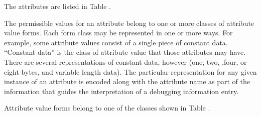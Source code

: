 The attributes are listed in Table .  

The permissible values
for an attribute belong to one or more classes of attribute
value forms.  
Each form class may be represented in one or more ways. 
For example, some attribute values consist
of a single piece of constant data. 
``Constant data''
is the class of attribute value that those attributes may have. 
There are several representations of constant data,
however (one, two, ,four, or eight bytes, and variable length
data). 
The particular representation for any given instance
of an attribute is encoded along with the attribute name as
part of the information that guides the interpretation of a
debugging information entry.  

Attribute value forms belong
to one of the classes shown in Table .

